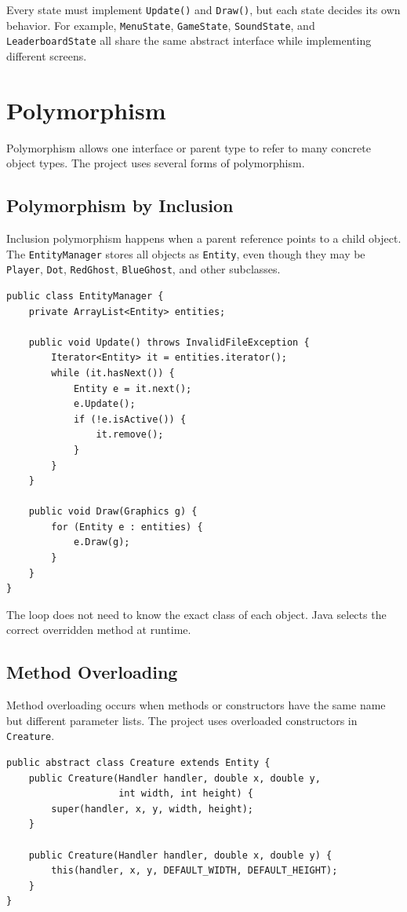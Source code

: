 \documentclass[12pt,a4paper]{article}
\begin{document}
Every state must implement \texttt{Update()} and \texttt{Draw()}, but each state decides its own behavior. For example, \texttt{MenuState}, \texttt{GameState}, \texttt{SoundState}, and \texttt{LeaderboardState} all share the same abstract interface while implementing different screens.

\section{Polymorphism}

Polymorphism allows one interface or parent type to refer to many concrete object types. The project uses several forms of polymorphism.

\subsection{Polymorphism by Inclusion}

Inclusion polymorphism happens when a parent reference points to a child object. The \texttt{EntityManager} stores all objects as \texttt{Entity}, even though they may be \texttt{Player}, \texttt{Dot}, \texttt{RedGhost}, \texttt{BlueGhost}, and other subclasses.

\begin{lstlisting}
public class EntityManager {
    private ArrayList<Entity> entities;

    public void Update() throws InvalidFileException {
        Iterator<Entity> it = entities.iterator();
        while (it.hasNext()) {
            Entity e = it.next();
            e.Update();
            if (!e.isActive()) {
                it.remove();
            }
        }
    }

    public void Draw(Graphics g) {
        for (Entity e : entities) {
            e.Draw(g);
        }
    }
}
\end{lstlisting}

The loop does not need to know the exact class of each object. Java selects the correct overridden method at runtime.

\subsection{Method Overloading}

Method overloading occurs when methods or constructors have the same name but different parameter lists. The project uses overloaded constructors in \texttt{Creature}.

\begin{lstlisting}
public abstract class Creature extends Entity {
    public Creature(Handler handler, double x, double y,
                    int width, int height) {
        super(handler, x, y, width, height);
    }

    public Creature(Handler handler, double x, double y) {
        this(handler, x, y, DEFAULT_WIDTH, DEFAULT_HEIGHT);
    }
}
\end{lstlisting}
\end{document}
